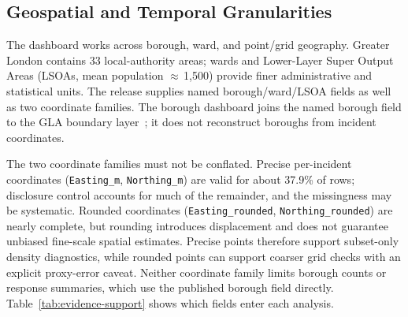 \subsection{Geospatial and Temporal Granularities}\label{sec:background-granularity}

The dashboard works across borough, ward, and point/grid geography. Greater London contains 33 local-authority areas; wards and Lower-Layer Super Output Areas (LSOAs, mean population $\approx$\,1{,}500) provide finer administrative and statistical units. The release supplies named borough/ward/LSOA fields as well as two coordinate families. The borough dashboard joins the named borough field to the GLA boundary layer~\cite{ons_boundaries}; it does not reconstruct boroughs from incident coordinates.

The two coordinate families must not be conflated. Precise per-incident coordinates (\texttt{Easting\_m}, \texttt{Northing\_m}) are valid for about 37.9\% of rows; disclosure control accounts for much of the remainder, and the missingness may be systematic. Rounded coordinates (\texttt{Easting\_rounded}, \texttt{Northing\_rounded}) are nearly complete, but rounding introduces displacement and does not guarantee unbiased fine-scale spatial estimates. Precise points therefore support subset-only density diagnostics, while rounded points can support coarser grid checks with an explicit proxy-error caveat. Neither coordinate family limits borough counts or response summaries, which use the published borough field directly. Table~\ref{tab:evidence-support} shows which fields enter each analysis.

